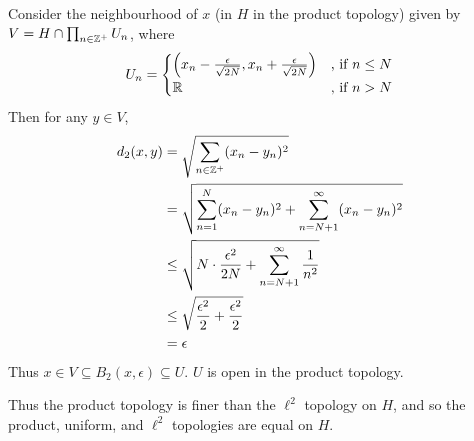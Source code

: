 \begin{enumerate}
Consider the neighbourhood of $x$ (in $H$ in the product topology) given by $ V = H \cap \prod_{n \in \mathbb Z^+} U_n$, where
\[U_n =
\begin{cases}
\left(x_n - \tfrac{\epsilon}{\sqrt{2N}}, x_n + \tfrac{\epsilon}{\sqrt{2N}} \right) & \textrm{, if } n \leq N \\
\mathbb R & \textrm{, if } n > N
\end{cases}
\]
Then for any $y \in V$,
\begin{align*}
d_2(x,y) &= \sqrt{\sum_{n\in\mathbb Z^+} (x_n-y_n)^2} \\
&= \sqrt{\sum_{n=1}^N (x_n-y_n)^2 + \sum_{n=N+1}^\infty (x_n-y_n)^2} \\
&\leq \sqrt{N \cdot \frac{\epsilon^2}{2N} + \sum_{n=N+1}^\infty \frac{1}{n^2}} \\
&\leq \sqrt{\frac{\epsilon^2}{2} + \frac{\epsilon^2}{2}} \\
&=\epsilon
\end{align*}
Thus $x \in V \subseteq B_2(x,\epsilon) \subseteq U$. $U$ is open in the product topology.

Thus the product topology is finer than the $\ell^2$ topology on $H$, and so the product, uniform, and $\ell^2$ topologies are equal on $H$.

\end{enumerate}

